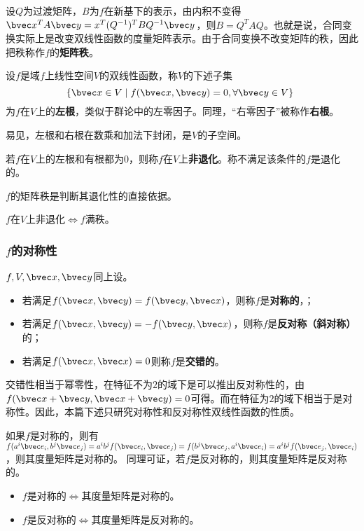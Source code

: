 设$Q$为过渡矩阵，$B$为$f$在新基下的表示，由内积不变得$\bvec x^TA\bvec y=x^T(Q^{-1})^TBQ^{-1}\bvec y$，则$B=Q^{T}AQ$。也就是说，合同变换实际上是改变双线性函数的度量矩阵表示。由于合同变换不改变矩阵的秩，因此把秩称作$f$的\textbf{矩阵秩}。
\begin{definition}{}
设$f$是域$f$上线性空间$V$的双线性函数，称$V$的下述子集
\begin{equation}
\{\bvec x \in V \mid f(\bvec x, \bvec y)=0, \forall \bvec y\in V\}~
\end{equation}
为$f$在$V$上的\textbf{左根}，类似于群论中的左零因子。同理，“右零因子”被称作\textbf{右根}。
\end{definition}
易见，左根和右根在数乘和加法下封闭，是$V$的子空间。
\begin{definition}{}
若$f$在$V$上的左根和有根都为${0}$，则称$f$在$V$上\textbf{非退化}。称不满足该条件的$f$是退化的。
\end{definition}
$f$的矩阵秩是判断其退化性的直接依据。
\begin{theorem}{}
$f$在$V$上非退化$\Leftrightarrow f$满秩。
\end{theorem}

\subsubsection{$f$的对称性}
\begin{definition}{}
$f,V,\bvec x,\bvec y$同上设。
\begin{itemize}
\item 若满足$f(\bvec x,\bvec y)=f(\bvec y,\bvec x)$，则称$f$是\textbf{对称的}，；
\item 若满足$f(\bvec x,\bvec y)=-f(\bvec y,\bvec x)$，则称$f$是\textbf{反对称（斜对称）}的；
\item 若满足$f(\bvec x,\bvec x)=0$则称$f$是\textbf{交错的}。
\end{itemize}
\end{definition}
交错性相当于幂零性，在特征不为$2$的域下是可以推出反对称性的，由$f(\bvec x+\bvec y,\bvec x+\bvec y)=0$可得。而在特征为$2$的域下相当于是对称性。因此，本篇下述只研究对称性和反对称性双线性函数的性质。

如果$f$是对称的，则有$f(a^i\bvec e_i,b^j\bvec e_j)=a^ib^jf(\bvec e_i,\bvec e_j)=f(b^j\bvec e_j,a^i\bvec e_i)=a^ib^jf(\bvec e_j,\bvec e_i)$，则其度量矩阵是对称的。
同理可证，若$f$是反对称的，则其度量矩阵是反对称的。
\begin{itemize}
\item $f$是对称的$\Leftrightarrow$其度量矩阵是对称的。
\item $f$是反对称的$\Leftrightarrow$其度量矩阵是反对称的。
\end{itemize}

